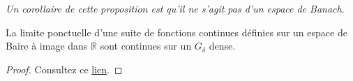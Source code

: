 \emph{Un corollaire de cette proposition est qu'il ne s'agit pas d'un espace de
Banach}.

\begin{thm}
  La limite ponctuelle d'une suite de fonctions continues définies sur un
  espace de Baire à image dans $\mathbb{R}$ sont
  continues sur un $G_\delta$ dense.
\end{thm}

\begin{proof}
  Consultez ce \href{https://proofwiki.org/wiki/Baire-Osgood_Theorem}{lien}.
\end{proof}


